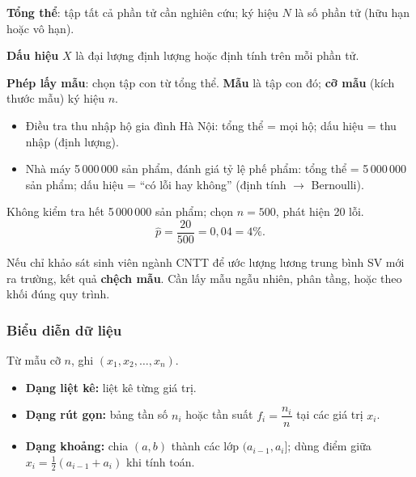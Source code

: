 \documentclass[12pt,a4paper]{article}
\begin{document}
\begin{dinhnghia}[title={Tổng thể và mẫu}]
  \textbf{Tổng thể}: tập tất cả phần tử cần nghiên cứu; ký hiệu $N$ là số phần tử (hữu hạn hoặc vô hạn).
  
  \textbf{Dấu hiệu} $X$ là đại lượng định lượng hoặc định tính trên mỗi phần tử.

  \textbf{Phép lấy mẫu}: chọn tập con từ tổng thể. \textbf{Mẫu} là tập con đó; \textbf{cỡ mẫu} (kích thước mẫu) ký hiệu $n$.
\end{dinhnghia}

\begin{vidu}[title={Tổng thể - thu nhập và phế phẩm}]
\begin{itemize}
  \item Điều tra thu nhập hộ gia đình Hà Nội: tổng thể = mọi hộ; dấu hiệu = thu nhập (định lượng).
  \item Nhà máy 5\,000\,000 sản phẩm, đánh giá tỷ lệ phế phẩm: tổng thể = 5\,000\,000 sản phẩm; dấu hiệu = ``có lỗi hay không'' (định tính $\to$ Bernoulli).
\end{itemize}
\end{vidu}

\begin{vidu}[title={Mẫu - tỷ lệ phế phẩm nhà máy}]
Không kiểm tra hết 5\,000\,000 sản phẩm; chọn $n = 500$, phát hiện 20 lỗi.
\[
  \hat{p} = \dfrac{20}{500} = 0{,}04 = 4\%.
\]
\end{vidu}

\begin{luuy}[title={Mẫu phải đại diện}]
Nếu chỉ khảo sát sinh viên ngành CNTT để ước lượng lương trung bình SV mới ra trường, kết quả \textbf{chệch mẫu}. Cần lấy mẫu ngẫu nhiên, phân tầng, hoặc theo khối đúng quy trình.
\end{luuy}

\subsubsection{Biểu diễn dữ liệu}

\begin{dinhnghia}[title={Các dạng bảng dữ liệu}]
  Từ mẫu cỡ $n$, ghi $(x_1, x_2, \ldots, x_n)$.
  \begin{itemize}
    \item \textbf{Dạng liệt kê:} liệt kê từng giá trị.
    \item \textbf{Dạng rút gọn:} bảng tần số $n_i$ hoặc tần suất $f_i = \dfrac{n_i}{n}$ tại các giá trị $x_i$.
    \item \textbf{Dạng khoảng:} chia $(a,b)$ thành các lớp $(a_{i-1}, a_i]$; dùng điểm giữa $x_i = \tfrac{1}{2}(a_{i-1}+a_i)$ khi tính toán.
  \end{itemize}
\end{dinhnghia}
\end{document}
